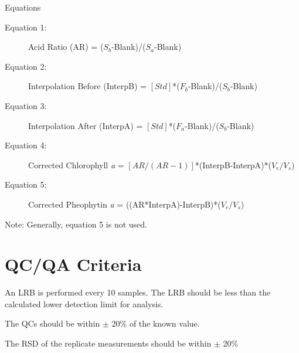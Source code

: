 \documentclass[12pt]{../SOP3}\usepackage[]{graphicx}\usepackage[]{color}
\begin{document}
\NP Equations
\begin{description}
\item[Equation 1:] Acid Ratio (AR) = ($S_b$-Blank)/($S_a$-Blank)
\item[Equation 2:] Interpolation Before (InterpB) = $[Std]$*($F_b$-Blank)/($S_b$-Blank)
\item[Equation 3:] Interpolation After (InterpA) = $[Std]$*($F_a$-Blank)/($S_b$-Blank)
\item[Equation 4:] Corrected Chlorophyll \textit{a} = $[AR/(AR-1)]$*(InterpB-InterpA)*($V_e/V_s$)
\item[Equation 5:] Corrected Pheophytin \textit{a} = ((AR*InterpA)-InterpB)*($V_e/V_s$)
\end{description}
Note: Generally, equation 5 is not used. 

\section{QC/QA Criteria}

\NP An LRB is performed every 10 samples. The LRB should be less than the calculated lower detection limit for analysis.

\NP The QCs should be within $\pm$ 20\% of the known value. 

\NP The RSD of the replicate measurements should be within $\pm$ 20\%
\end{document}
